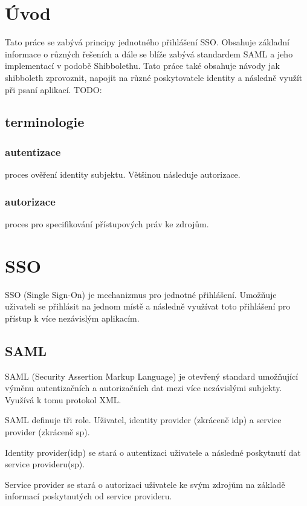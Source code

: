 \chapter{Úvod}
Tato práce se zabývá principy jednotného přihlášení SSO. Obsahuje základní informace o různých řešeních a dále se blíže zabývá standardem SAML a jeho implementací v podobě Shibbolethu. Tato práce také obsahuje návody jak shibboleth zprovoznit, napojit na různé poskytovatele identity a následně využít při psaní aplikací.
TODO:
\section{terminologie}
\subsection{autentizace}
proces ověření identity subjektu. Většinou následuje autorizace.\cite{Authorization}
\subsection{autorizace}
proces pro specifikování přístupových práv ke zdrojům.\cite{Autentizace}

\chapter{SSO}
\label{sso}
SSO (Single Sign-On) je mechanizmus pro jednotné přihlášení. Umožňuje uživateli se přihlásit na jednom místě a následně využívat toto přihlášení pro přístup k více nezávislým aplikacím. \cite{SSO}

\section{SAML}

SAML\cite{SAMLofficialSite}\cite{WhatIsSaml} (Security Assertion Markup Language) je otevřený standard umožňující výměnu autentizačních a autorizačních dat mezi více nezávislými subjekty. Využívá k tomu protokol XML. 

SAML definuje tři role. Uživatel, identity provider (zkráceně idp) a service provider (zkráceně sp). 

Identity provider(idp) se stará o autentizaci uživatele a následné poskytnutí dat service provideru(sp).

Service provider se stará o autorizaci uživatele ke svým zdrojům na základě informací poskytnutých od service provideru.

